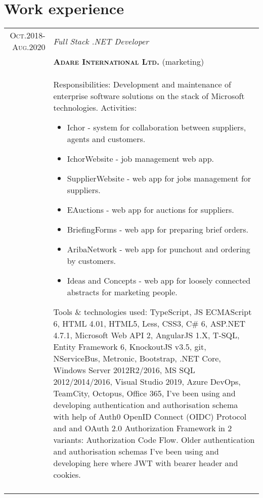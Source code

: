 \documentclass[a4paper,12pt]{article}
\begin{document}
\section{Work experience}
\begin{tabular}{r|p{12cm}}
\textsc{Oct.2018-Aug.2020}
	&\emph{Full Stack .NET Developer}\\
	&\textsc{\textbf{Adare International Ltd.}} (marketing)\\
	&\footnotesize{
		Responsibilities: Development and maintenance of enterprise software solutions on the stack of Microsoft technologies.\newline
		Activities:
		\begin{itemize}
			\item Ichor - system for collaboration between suppliers, agents and customers.
			\item IchorWebsite - job management web app.
			\item SupplierWebsite - web app for jobs management for suppliers.
			\item EAuctions - web app for auctions for suppliers.
			\item BriefingForms - web app for preparing brief orders.
			\item AribaNetwork - web app for punchout and ordering by customers.
			\item Ideas and Concepts - web app for loosely connected abstracts for marketing people.
		\end{itemize}
		Tools \& technologies used: \newline
		TypeScript, JS ECMAScript 6, HTML 4.01, HTML5, Less, CSS3, C# 6, ASP.NET 4.7.1, Microsoft Web API 2, 
		AngularJS 1.X, T-SQL, Entity Framework 6, KnockoutJS v3.5, git, NServiceBus, Metronic, Bootstrap, 
		.NET Core, Windows Server 2012R2/2016, MS SQL 2012/2014/2016,
		Visual Studio 2019, Azure DevOps, TeamCity, Octopus, Office 365,
		I've been using and developing authentication and authorisation schema with help of 
		Auth0 OpenID Connect (OIDC) Protocol and and OAuth 2.0 Authorization Framework in 2 variants: Authorization Code Flow.
		Older authentication and authorisation schemas I've been using and developing here where JWT with bearer header and cookies.
	}\\
	\multicolumn{2}{c}{}\\
\end{tabular}
\end{document}
